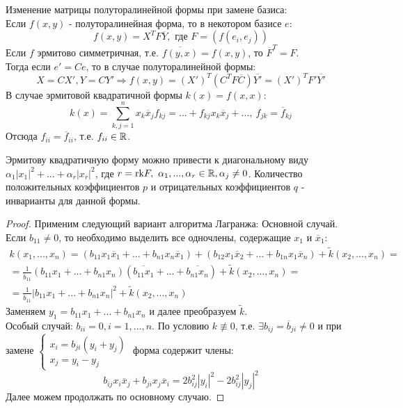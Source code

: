 Изменение матрицы полуторалинейной формы при замене базиса:\\
Если $f(x, y)$ - полуторалинейная форма, то в некотором базисе $e:$ 
$$f(x, y) = X^TF\overline{Y}, \text{ где } F = (f(e_i, e_j))$$ 
Если $f$ эрмитово симметричная, т.е. $\overline{f(y, x)} = f(x, y)$, то $\overline{F}^T = F$.\\
Тогда если $e' = Ce$, то в случае полуторалинейной формы:
$$X = CX', Y = CY' \Rightarrow f(x, y) = (X')^T(C^TF\overline{C})\overline{Y'} = (X')^TF'\overline{Y'}$$
В случае эрмитовой квадратичной формы $k(x) = f(x,x)$:
$$k(x) = \sum \limits_{k,j = 1}^n x_k\overline{x}_jf_{kj} = ... + f_{kj}x_k\overline{x}_j + ... , \ f_{jk} = \overline{f}_{kj}$$
Отсюда $f_{ii} = \overline{f}_{ii}$, т.е. $f_{ii} \in \mathbb{R}$.
\begin{theorem}
    Эрмитову квадратичную форму можно привести к диагональному виду $\alpha_1|x_1|^2 + ... + \alpha_r|x_r|^2$, где $r = \text{rk} F, \ \alpha_1,...,\alpha_r \in \mathbb{R}, \alpha_j \neq 0$. Количество положительных коэффициентов $p$ и отрицательных коэффициентов $q$ - инварианты для данной формы. 
\end{theorem}
\begin{proof}
    Применим следующий вариант алгоритма Лагранжа:
    Основной случай. Если $b_{11} \neq 0$, то необходимо выделить все одночлены, содержащие $x_1$ и $\overline{x}_1$:
    \begin{multline*}
    k(x_1,...,x_n) = (b_{11}x_1\overline{x}_1 + ... + b_{n1}x_n\overline{x}_1) + (b_{12}x_1\overline{x}_2 + ... + b_{1n}x_1\overline{x}_n) + \tilde{k}(x_2,...,x_n) =\\= \frac{1}{\overline{b}_{11}}(b_{11}x_1 + ... + b_{n1}x_n)(\overline{b_{11}x_1} + ... + \overline{b_{n1}x_n}) + \tilde{k}(x_2,...,x_n) =\\= \frac{1}{\overline{b}_{11}}|b_{11}x_1 + ... + b_{n1}x_n|^2 + \tilde{k}(x_2,...,x_n)
    \end{multline*}
    Заменяем $y_1 = b_{11}x_1 + ... + b_{n1}x_n$ и далее преобразуем $\tilde{k}$.\\
    Особый случай: $b_{ii} = 0, i = 1,...,n$. По условию $k \not \equiv 0$, т.е. $\exists b_{ij} = \overline{b}_{ji} \neq 0$ и при замене $\begin{cases}
        x_i = b_{ji}(y_i + y_j)\\
        x_j = y_i - y_j
    \end{cases}$ форма содержит члены: 
    $$b_{ij}x_i\overline{x}_j + b_{ji}x_j\overline{x}_i = 2b_{ij}^2|y_i|^2 - 2b_{ij}^2|y_j|^2$$
    Далее можем продолжать по основному случаю.
\end{proof}

